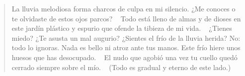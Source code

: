 \documentclass[a4paper, 12pt]{article}
\begin{document}
\pagebreak 


\begin{verse}
    
La lluvia melodiosa forma charcos 
de culpa en mi silencio. ¿Me conoces
o te olvidaste de estos ojos parcos?
~
Todo está lleno de almas y de dioses
en este jardín plástico y espurio
que ofende la tibieza de mi vida.
~
¿Tienes miedo? ¿Te asusta un mal augurio?
¿Sientes el frío de la lluvia herida?
No: todo lo ignoras. Nada es bello
ni atroz ante tus manos. Este frío 
hiere unos huesos que has desocupado.
~
El nudo que agobió una vez tu cuello
quedó cerrado siempre sobre el mío.
~
(Todo es gradual y eterno de este lado.)
\end{verse}
\end{document}

